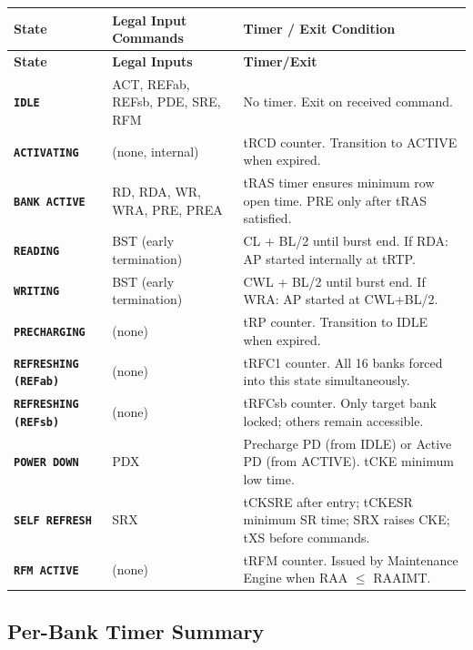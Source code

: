 \documentclass[11pt,a4paper]{article}
\newcommand{\st}[1]{\textcolor{ddrblue}{\texttt{\textbf{#1}}}}
\begin{document}
\begin{longtable}{L{2.8cm} L{4.5cm} L{7.2cm}}
\toprule
\textbf{State} & \textbf{Legal Input Commands} & \textbf{Timer / Exit Condition} \\
\midrule
\endfirsthead\toprule\textbf{State}&\textbf{Legal Inputs}&\textbf{Timer/Exit}\\\midrule\endhead\bottomrule\endfoot
{}
\st{IDLE}      & ACT, REFab, REFsb, PDE, SRE, RFM & No timer. Exit on received command. \\
\st{ACTIVATING}& (none, internal) & tRCD counter. Transition to ACTIVE when expired. \\
\st{BANK ACTIVE}& RD, RDA, WR, WRA, PRE, PREA & tRAS timer ensures minimum row open time. PRE only after tRAS satisfied. \\
\st{READING}   & BST (early termination) & CL + BL/2 until burst end. If RDA: AP started internally at tRTP. \\
\st{WRITING}   & BST (early termination) & CWL + BL/2 until burst end. If WRA: AP started at CWL+BL/2. \\
\st{PRECHARGING}& (none) & tRP counter. Transition to IDLE when expired. \\
\st{REFRESHING (REFab)} & (none) & tRFC1 counter. All 16 banks forced into this state simultaneously. \\
\st{REFRESHING (REFsb)} & (none) & tRFCsb counter. Only target bank locked; others remain accessible. \\
\st{POWER DOWN} & PDX & Precharge PD (from IDLE) or Active PD (from ACTIVE). tCKE minimum low time. \\
\st{SELF REFRESH}& SRX & tCKSRE after entry; tCKESR minimum SR time; SRX raises CKE; tXS before commands. \\
\st{RFM ACTIVE} & (none) & tRFM counter. Issued by Maintenance Engine when RAA $\leq$ RAAIMT. \\
\end{longtable}

\subsection{Per-Bank Timer Summary}
\end{document}
